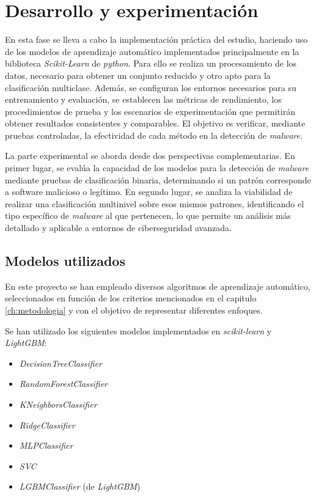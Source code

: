 \chapter{Desarrollo y experimentación}
\label{ch:desarrollo}

En esta fase se lleva a cabo la implementación práctica del estudio, haciendo uso de los modelos de aprendizaje automático implementados principalmente en la biblioteca \textit{Scikit-Learn} de \textit{python}. Para ello se realiza un procesamiento de los datos, necesario para obtener un conjunto reducido y otro apto para la clasificación multiclase. Además, se configuran los entornos necesarios para su entrenamiento y evaluación, se establecen las métricas de rendimiento, los procedimientos de prueba y los escenarios de experimentación que permitirán obtener resultados consistentes y comparables. El objetivo es verificar, mediante pruebas controladas, la efectividad de cada método en la detección de \textit{malware}.

\vspace{1em}

La parte experimental se aborda desde dos perspectivas complementarias. En primer lugar, se evalúa la capacidad de los modelos para la detección de \textit{malware} mediante pruebas de clasificación binaria, determinando si un patrón corresponde a software malicioso o legítimo. En segundo lugar, se analiza la viabilidad de realizar una clasificación multinivel sobre esos mismos patrones, identificando el tipo específico de \textit{malware} al que pertenecen, lo que permite un análisis más detallado y aplicable a entornos de ciberseguridad avanzada.

\newpage
\section{Modelos utilizados}
\label{sec:modelos_utilizados}

En este proyecto se han empleado diversos algoritmos de aprendizaje automático, seleccionados en función de los criterios mencionados en el capitulo \ref{ch:metodologia} y con el objetivo de representar diferentes enfoques.

Se han utilizado los siguientes modelos implementados en \textit{scikit-learn} y \textit{LightGBM}:

\begin{itemize}
	\item \textit{DecisionTreeClassifier}
	\item \textit{RandomForestClassifier}
	\item \textit{KNeighborsClassifier}
	\item \textit{RidgeClassifier}
	\item \textit{MLPClassifier}
	\item \textit{SVC}
	\item \textit{LGBMClassifier} (de \textit{LightGBM})
\end{itemize}

